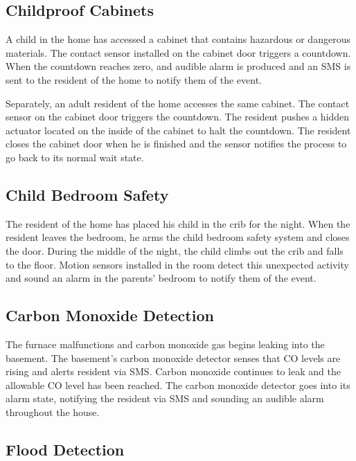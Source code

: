 \documentclass{report}
\begin{document}
\subsection*{Childproof Cabinets}

A child in the home has accessed a cabinet that contains hazardous or dangerous
materials. The contact sensor installed on the cabinet door triggers a
countdown. When the countdown reaches zero, and audible alarm is produced and
an SMS is sent to the resident of the home to notify them of the event.

Separately, an adult resident of the home accesses the same cabinet. The
contact sensor on the cabinet door triggers the countdown. The resident pushes
a hidden actuator located on the inside of the cabinet to halt the countdown.
The resident closes the cabinet door when he is finished and the sensor
notifies the process to go back to its normal wait state.

\subsection*{Child Bedroom Safety}

The resident of the home has placed his child in the crib for the night. When
the resident leaves the bedroom, he arms the child bedroom safety system and
closes the door. During the middle of the night, the child climbs out the crib
and falls to the floor. Motion sensors installed in the room detect this
unexpected activity and sound an alarm in the parents' bedroom to notify them
of the event.

\subsection*{Carbon Monoxide Detection}

The furnace malfunctions and carbon monoxide gas begins leaking into the
basement. The basement's carbon monoxide detector senses that CO levels are
rising and alerts resident via SMS. Carbon monoxide continues to leak and the
allowable CO level has been reached. The carbon monoxide detector goes into its
alarm state, notifying the resident via SMS and sounding an audible alarm
throughout the house.

\subsection*{Flood Detection}
\end{document}
